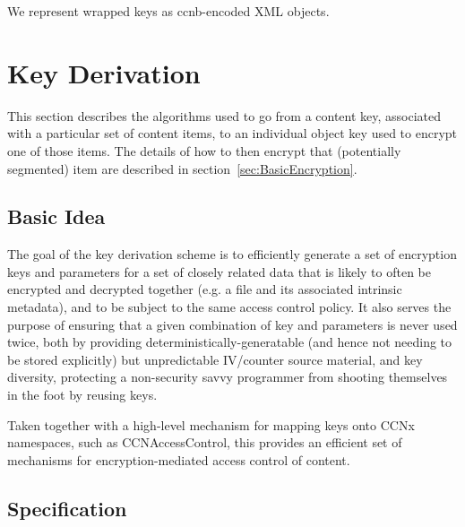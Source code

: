 We represent wrapped keys as ccnb-encoded XML objects. 

\newpage

\section{Key Derivation}
\label{sec:KeyDerivation}

This section describes the algorithms used to go from a content key,
associated with a particular set of content items, to an individual
object key used to encrypt one of those items. The details of how to
then encrypt that (potentially segmented) item are described in
section~\ref{sec:BasicEncryption}.

\subsection{Basic Idea}

The goal of the key derivation scheme is to efficiently generate a set
of encryption keys and parameters for a set of closely related data
that is likely to often be encrypted and decrypted together (e.g. a
file and its associated intrinsic metadata), and to be subject to the
same access control policy. It also serves the purpose of ensuring
that a given combination of key and parameters is never used twice,
both by providing deterministically-generatable (and hence not needing
to be stored explicitly) but unpredictable IV/counter source material,
and key diversity, protecting a non-security savvy programmer from
shooting themselves in the foot by reusing keys.

Taken together with a high-level mechanism for mapping keys onto CCNx
namespaces, such as CCNAccessControl, this provides an efficient set
of mechanisms for encryption-mediated access control of content.

\subsection{Specification}

